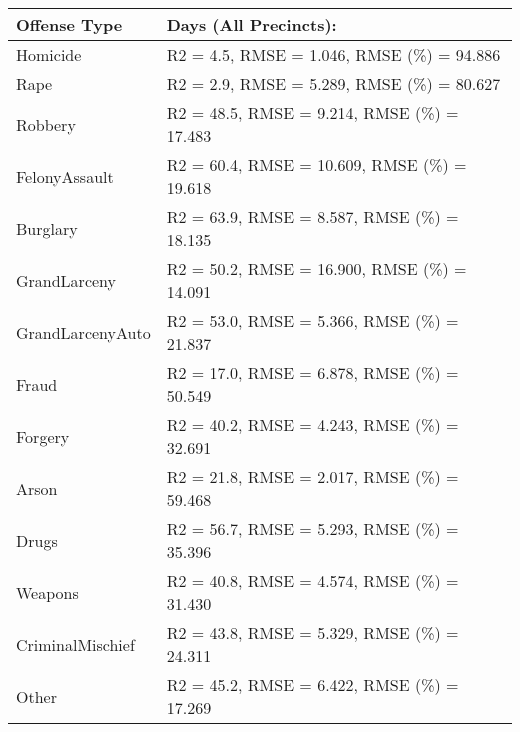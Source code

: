 \documentclass[10pt,journal,compsoc]{IEEEtran}
\begin{document}
\begin{tabular}{ |p{3cm}|p{4cm}|  }
 \hline
 Offense Type&Days (All Precincts):\\
  \hline
Homicide& R2 = 4.5, RMSE = 1.046, RMSE (\%) = 94.886\\
 \hline
Rape& R2 = 2.9, RMSE = 5.289, RMSE (\%) = 80.627\\
 \hline
Robbery &R2 = 48.5, RMSE = 9.214, RMSE (\%) = 17.483 \\
 \hline
FelonyAssault& R2 = 60.4, RMSE = 10.609, RMSE (\%) = 19.618\\
 \hline
Burglary &R2 = 63.9, RMSE = 8.587, RMSE (\%) = 18.135\\
 \hline
GrandLarceny &R2 = 50.2, RMSE = 16.900, RMSE (\%) = 14.091\\
 \hline
GrandLarcenyAuto &R2 = 53.0, RMSE = 5.366, RMSE (\%) = 21.837\\
 \hline
Fraud& R2 = 17.0, RMSE = 6.878, RMSE (\%) = 50.549\\
 \hline
Forgery &R2 = 40.2, RMSE = 4.243, RMSE (\%) = 32.691\\
 \hline
Arson &R2 = 21.8, RMSE = 2.017, RMSE (\%) = 59.468\\
 \hline
Drugs& R2 = 56.7, RMSE = 5.293, RMSE (\%) = 35.396\\
 \hline
Weapons& R2 = 40.8, RMSE = 4.574, RMSE (\%) = 31.430\\
 \hline
CriminalMischief& R2 = 43.8, RMSE = 5.329, RMSE (\%) = 24.311\\
 \hline
Other &R2 = 45.2, RMSE = 6.422, RMSE (\%) = 17.269\\
 \hline

\end{tabular}



%
\end{document}
